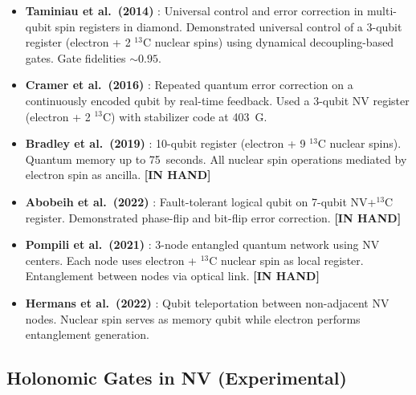 \documentclass[11pt,letterpaper]{article}
\newcommand{\inhand}{\textcolor{green!50!black}{\textbf{[IN HAND]}}}
\begin{document}
\begin{itemize}[leftmargin=*]
    \item \textbf{Taminiau et al.\ (2014)} \cite{Taminiau2014}: Universal control and error correction in multi-qubit spin registers in diamond. Demonstrated universal control of a 3-qubit register (electron + 2 $^{13}$C nuclear spins) using dynamical decoupling-based gates. Gate fidelities $\sim 0.95$. %

    \item \textbf{Cramer et al.\ (2016)} \cite{Cramer2016}: Repeated quantum error correction on a continuously encoded qubit by real-time feedback. Used a 3-qubit NV register (electron + 2 $^{13}$C) with stabilizer code at 403~G. %

    \item \textbf{Bradley et al.\ (2019)} \cite{Bradley2019}: 10-qubit register (electron + 9 $^{13}$C nuclear spins). Quantum memory up to 75~seconds. All nuclear spin operations mediated by electron spin as ancilla. \inhand

    \item \textbf{Abobeih et al.\ (2022)} \cite{Abobeih2022}: Fault-tolerant logical qubit on 7-qubit NV+$^{13}$C register. Demonstrated phase-flip and bit-flip error correction. \inhand

    \item \textbf{Pompili et al.\ (2021)} \cite{Pompili2021}: 3-node entangled quantum network using NV centers. Each node uses electron + $^{13}$C nuclear spin as local register. Entanglement between nodes via optical link. \inhand

    \item \textbf{Hermans et al.\ (2022)} \cite{Hermans2022}: Qubit teleportation between non-adjacent NV nodes. Nuclear spin serves as memory qubit while electron performs entanglement generation. %
\end{itemize}

\subsection{Holonomic Gates in NV (Experimental)}
\end{document}

